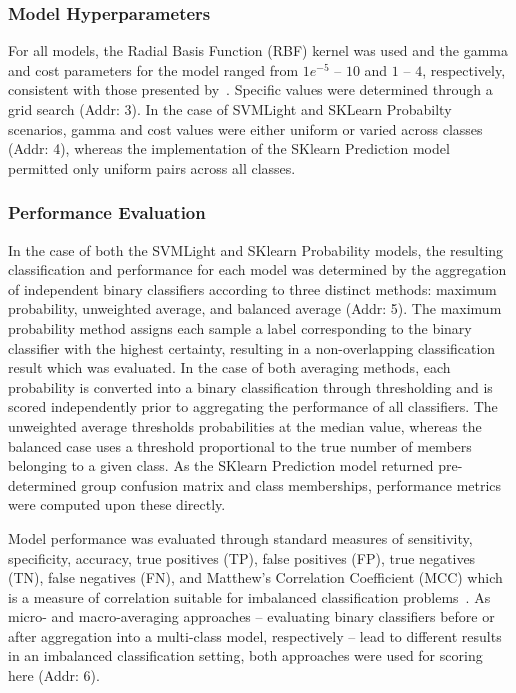 \subsubsection{Model Hyperparameters}
For all models, the Radial Basis Function (RBF) kernel was used and the gamma and cost parameters for the model ranged
from $1e^{-5}$ -- $10$ and $1$ -- $4$, respectively, consistent with those presented by~\cite{mishra2014prediction}.
Specific values were determined through a grid search (Addr: 3). In the case of SVMLight and SKLearn Probabilty
scenarios, gamma and cost values were either uniform or varied across classes (Addr: 4), whereas the implementation of
the SKlearn Prediction model permitted only uniform pairs across all classes.

\subsubsection{Performance Evaluation}
In the case of both the SVMLight and SKlearn Probability models, the resulting classification and performance for each
model was determined by the aggregation of independent binary classifiers according to three distinct methods: maximum
probability, unweighted average, and balanced average (Addr: 5). The maximum probability method assigns each sample a
label corresponding to the binary classifier with the highest certainty, resulting in a non-overlapping classification
result which was evaluated. In the case of both averaging methods, each probability is converted into a  binary
classification through thresholding and is scored independently prior to aggregating the performance of all classifiers.
The unweighted average thresholds probabilities at the median value, whereas the balanced case uses a threshold
proportional to the true number of members belonging to a given class. As the SKlearn Prediction model returned
pre-determined group confusion matrix and class memberships, performance metrics were computed upon these directly.

Model performance was evaluated through standard measures of sensitivity, specificity, accuracy, true positives (TP),
false positives (FP), true negatives (TN), false negatives (FN), and Matthew's Correlation Coefficient (MCC) which is a
measure of correlation suitable for imbalanced classification problems~\citep{mcc2017optimal}. As micro- and
macro-averaging approaches -- evaluating binary classifiers before or after aggregation into a multi-class model,
respectively -- lead to different results in an imbalanced classification setting, both approaches were used for
scoring here (Addr: 6).


